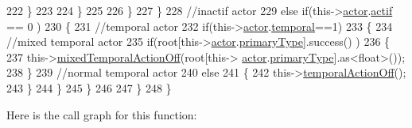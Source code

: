 \begin{DoxyCode}
222                     \}
223                                         
224                 \}
225 
226             \}
227         \}
228         \textcolor{comment}{//inactif actor}
229         \textcolor{keywordflow}{else} \textcolor{keywordflow}{if}(this->\hyperlink{class_cool_board_actor_a8f190db9f7a39fddbcef7f152da970e9}{actor}.\hyperlink{struct_cool_board_actor_1_1state_a7963178c2de01ef0d2861f9f59ad6f3c}{actif} == 0 )
230         \{
231             \textcolor{comment}{//temporal actor}
232             \textcolor{keywordflow}{if}(this->\hyperlink{class_cool_board_actor_a8f190db9f7a39fddbcef7f152da970e9}{actor}.\hyperlink{struct_cool_board_actor_1_1state_a6442a8c3a30abc48472f3e5284b786ea}{temporal}==1)
233             \{
234                 \textcolor{comment}{//mixed temporal actor}
235                 \textcolor{keywordflow}{if}(root[this->\hyperlink{class_cool_board_actor_a8f190db9f7a39fddbcef7f152da970e9}{actor}.\hyperlink{struct_cool_board_actor_1_1state_a8a0b318fd2814cf67fe74ee8164df55e}{primaryType}].success() )
236                 \{
237                     this->\hyperlink{class_cool_board_actor_a00b29c4abf0388551aa6812372113cf1}{mixedTemporalActionOff}(root[this->
      \hyperlink{class_cool_board_actor_a8f190db9f7a39fddbcef7f152da970e9}{actor}.\hyperlink{struct_cool_board_actor_1_1state_a8a0b318fd2814cf67fe74ee8164df55e}{primaryType}].as<\textcolor{keywordtype}{float}>());
238                 \}
239                 \textcolor{comment}{//normal temporal actor}
240                 \textcolor{keywordflow}{else}
241                 \{
242                     this->\hyperlink{class_cool_board_actor_a02698bd647df49cabbe74513d4d88918}{temporalActionOff}();
243                 \}
244             \}           
245         \}
246 
247     \} 
248 \}
\end{DoxyCode}
Here is the call graph for this function\+:\nopagebreak
